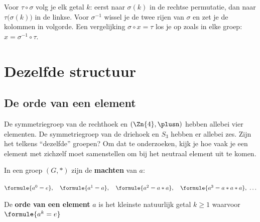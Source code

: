 \begin{werkwijze}
Voor $\tau \circ \sigma$ volg je elk getal $k$: eerst naar $\sigma(k)$ in de rechtse permutatie, dan naar $\tau\bigl(\sigma(k)\bigr)$ in de linkse. Voor $\sigma^{-1}$ wissel je de twee rijen van $\sigma$ en zet je de kolommen in volgorde. Een vergelijking $\sigma \circ x = \tau$ los je op zoals in elke groep: $x = \sigma^{-1} \circ \tau$.
\end{werkwijze}


\begin{oefeningen}
\end{oefeningen}

\section{Dezelfde structuur}

\subsection{De orde van een element}

De symmetriegroep van de rechthoek en $(\Zn{4}, \plusn)$ hebben allebei vier elementen. De symmetriegroep van de driehoek en $S_3$ hebben er allebei zes. Zijn het telkens ``dezelfde'' groepen? Om dat te onderzoeken, kijk je hoe vaak je een element met zichzelf moet samenstellen om bij het neutraal element uit te komen.

\begin{theorie}
In een groep $(G, \ast)$ zijn de \textbf{\textcolor{accent}{machten}} van $a$:

\vspace{1mm}
\qquad $\formule{a^0 = e}, \quad \formule{a^1 = a}, \quad \formule{a^2 = a \ast a}, \quad \formule{a^3 = a \ast a \ast a}, \ \ldots$

\vspace{1mm}
De \textbf{\textcolor{accent}{orde van een element}} $a$ is het kleinste natuurlijk getal $k \geqslant 1$ waarvoor \quad $\formule{a^k = e}$
\end{theorie}

